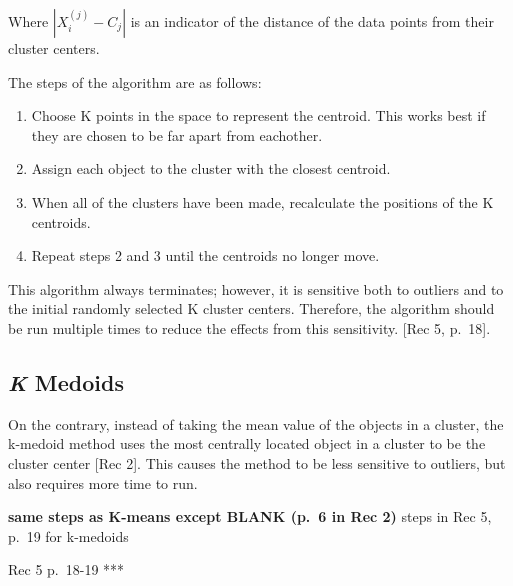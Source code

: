 \documentclass[12pt,twoside]{amherstthesis}
\providecommand{\tightlist}{%
  \setlength{\itemsep}{0pt}\setlength{\parskip}{0pt}}
\begin{document}
  Where \(|{{X_i^{(j)}- C_j}}|\) is an indicator of the distance of the
  data points from their cluster centers.
  
  The steps of the algorithm are as follows:
  
  \begin{enumerate}
  \def\labelenumi{\arabic{enumi}.}
  \tightlist
  \item
    Choose K points in the space to represent the centroid. This works
    best if they are chosen to be far apart from eachother.
  \item
    Assign each object to the cluster with the closest centroid.
  \item
    When all of the clusters have been made, recalculate the positions of
    the K centroids.
  \item
    Repeat steps 2 and 3 until the centroids no longer move.
  \end{enumerate}
  
  This algorithm always terminates; however, it is sensitive both to
  outliers and to the initial randomly selected K cluster centers.
  Therefore, the algorithm should be run multiple times to reduce the
  effects from this sensitivity. {[}Rec 5, p.~18{]}.
  
  \subsection{\texorpdfstring{\emph{K}
  Medoids}{K Medoids}}\label{k-medoids}
  
  On the contrary, instead of taking the mean value of the objects in a
  cluster, the k-medoid method uses the most centrally located object in a
  cluster to be the cluster center {[}Rec 2{]}. This causes the method to
  be less sensitive to outliers, but also requires more time to run.
  
  \textbf{same steps as K-means except BLANK (p.~6 in Rec 2) }steps in Rec
  5, p.~19 for k-medoids
  
  Rec 5 p.~18-19 ***
  
  \begin{Shaded}
  \begin{Highlighting}[]
  
  \NormalTok{(} \NormalTok{, }
         \NormalTok{, }
         \NormalTok{, } \NormalTok{, } \NormalTok{)}
  \end{Highlighting}
  \end{Shaded}
  
\end{document}
